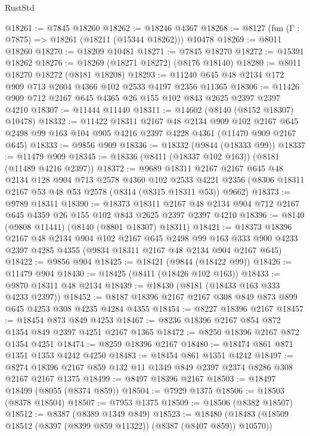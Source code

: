 \begin{lexlean}{RustStd}
\begin{coremodule}
@18261 := @7845 @18260
@18262 := @18246 @4367
@18268 := @8127 (fun (Γ : @7875) => @18261 (@18211 (@15344 @18262))) @10478
@18269 := @8011 @18260
@18270 := @18209 @10481
@18271 := @7845 @18270
@18272 := @15391 @18262
@18276 := @18269 (@18271 @18272) (@8176 @18140)
@18280 := @8011 @18270 @18272 (@8181 @18208)
@18293 := @11240 @645 @48 @2134 @172 @909 @713 @2604 @4366 @102 @2533 @4197 @2356 @11365
@18306 := @11426 @909 @712 @2167 @645 @4365 @26 @155 @102 @843 @2625 @2397 @2397 @4210
@18307 := @11444 @11440
@18311 := @14602 (@8140 (@8152 @18307) @10478)
@18332 := @11422
    @18311
    @2167
    @48
    @2134
    @909
    @102
    @2167
    @645
    @2498
    @99
    @163
    @104
    @905
    @4216
    @2397
    @4228
    @4361
    (@11470 @909 @2167 @645)
@18333 := @9856 @909
@18336 := @18332 (@9844 (@18333 @99))
@18337 := @11479 @909
@18345 := @18336 (@8411 (@18337 @102 @163)) (@8181 (@11489 @4216 @2397))
@18372 := @9689
    @18311
    @2167
    @2167
    @645
    @48
    @2134
    @128
    @904
    @713
    @2578
    @4360
    @102
    @2533
    @4221
    @2356
    (@8306 @18311 @2167 @53 @48 @53 @2578 (@8314 (@8315 @18311 @53)) @9662)
@18373 := @9789 @18311
@18390 := @18373
    @18311
    @2167
    @48
    @2134
    @904
    @712
    @2167
    @645
    @4359
    @26
    @155
    @102
    @843
    @2625
    @2397
    @2397
    @4210
@18396 := @8140 (@9808 @11441) (@8140 (@8801 @18307) @18311)
@18421 := @18373
    @18396
    @2167
    @48
    @2134
    @904
    @102
    @2167
    @645
    @2498
    @99
    @163
    @333
    @900
    @4233
    @2397
    @4285
    @4355
    (@9834 @18311 @2167 @48 @2134 @904 @2167 @645)
@18422 := @9856 @904
@18425 := @18421 (@9844 (@18422 @99))
@18426 := @11479 @904
@18430 := @18425 (@8411 (@18426 @102 @163))
@18433 := @9870 @18311 @48 @2134
@18439 := @18430 (@8181 (@18433 @163 @333 @4233 @2397))
@18452 := @8187 @18396 @2167 @2167 @308 @849 @873 @899 @645 @4253 @308 @4235 @4284 @4355
@18454 := @8227 @18396 @2167
@18457 := @18454 @873 @849 @4253
@18467 := @8236 @18396 @2167 @854 @872 @1354 @849 @2397 @4251 @2167 @1365
@18472 := @8250 @18396 @2167 @872 @1354 @4251
@18474 := @8259 @18396 @2167
@18480 := @18474 @861 @871 @1351 @1353 @4242 @4250
@18483 := @18454 @861 @1351 @4242
@18497 := @8274 @18396 @2167 @859 @132 @11 @1349 @849 @2397 @2374 @8286 @308 @2167 @2167 @1375
@18499 := @8497 @18396 @2167
@18503 := @18497 @18499 (@8055 (@8374 @859))
@18504 := @7929 @1375
@18506 := @18503 (@8378 @18504)
@18507 := @7953 @1375
@18509 := @18506 (@8382 @18507)
@18512 := @8387 (@8389 @1349 @849)
@18523 := @18480 (@18483 (@18509 @18512 (@8397 (@8399 @859 @11322)) (@8387 (@8407 @859)) @10570))

\end{coremodule}
\end{lexlean}
